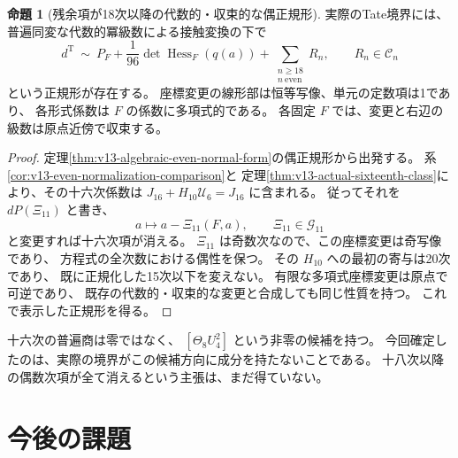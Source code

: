 \documentclass[a4paper,11pt]{ltjsarticle}
\theoremstyle{definition}
\newtheorem{theorem}{命題}[section]
\begin{document}
\begin{theorem}[残余項が18次以降の代数的・収束的な偶正規形]
\label{thm:v13-eighteenth-even-normal-form}
実際のTate境界には、普遍同変な代数的冪級数による接触変換の下で
\begin{equation}\label{eq:v13-eighteenth-even-normal-form}
 \boxed{\displaystyle
 d^{\mathrm T}\ \sim\
 P_F+\frac1{96}\det\operatorname{Hess}_F(q(a))
       +\sum_{\substack{n\ge18\\n\ \mathrm{even}}}R_n,
 \qquad R_n\in\mathcal C_n
 }
\end{equation}
という正規形が存在する。
座標変更の線形部は恒等写像、単元の定数項は1であり、
各形式係数は $F$ の係数に多項式的である。
各固定 $F$ では、変更と右辺の級数は原点近傍で収束する。
\end{theorem}
\begin{proof}
定理\ref{thm:v13-algebraic-even-normal-form}の偶正規形から出発する。
系\ref{cor:v13-even-normalization-comparison}と
定理\ref{thm:v13-actual-sixteenth-class}により、その十六次係数は
$J_{16}+H_{10}\mathcal U_6=J_{16}$ に含まれる。
従ってそれを $dP(\Xi_{11})$ と書き、
\[
 a\longmapsto a-\Xi_{11}(F,a),\qquad \Xi_{11}\in\mathcal G_{11}
\]
と変更すれば十六次項が消える。
$\Xi_{11}$ は奇数次なので、この座標変更は奇写像であり、
方程式の全次数における偶性を保つ。
その $H_{10}$ への最初の寄与は20次であり、
既に正規化した15次以下を変えない。
有限な多項式座標変更は原点で可逆であり、
既存の代数的・収束的な変更と合成しても同じ性質を持つ。
これで表示した正規形を得る。
\end{proof}

十六次の普遍商は零ではなく、
$[\Theta_8U_4^2]$ という非零の候補を持つ。
今回確定したのは、実際の境界がこの候補方向に成分を持たないことである。
十八次以降の偶数次項が全て消えるという主張は、まだ得ていない。


\clearpage
\section{今後の課題}
\end{document}
